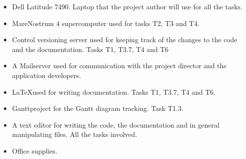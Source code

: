 \begin{itemize}
  \item Dell Latitude 7490. Laptop that the project author will use for all the tasks.
  \item MareNostrum 4 supercomputer used for tasks T2, T3 and T4.
  \item Control versioning server used for keeping track of the changes to the code and the documentation. Tasks T1, T3.7, T4 and T6
  \item A Mailserver used for communication with the project director and the application developers.
  \item \LaTeX used for writing documentation. Tasks T1, T3.7, T4 and T6.
  \item Ganttproject for the Gantt diagram tracking. Task T1.3.
  \item A text editor for writing the code, the documentation and in general manipulating files. All the tasks involved.
  \item Office supplies.
\end{itemize}
